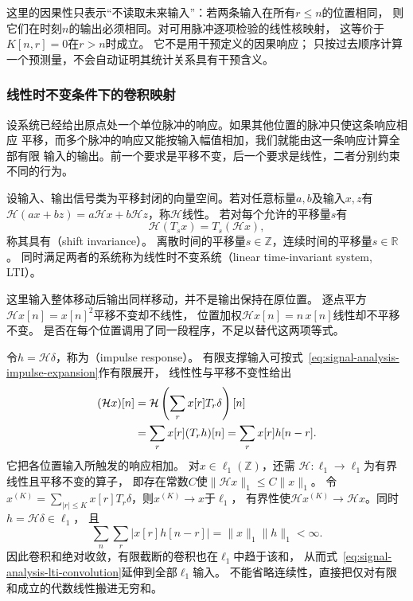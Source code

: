 这里的因果性只表示“不读取未来输入”：若两条输入在所有$r\leq n$的位置相同，
则它们在时刻$n$的输出必须相同。对可用脉冲逐项检验的线性核映射，
这等价于$K[n,r]=0$在$r>n$时成立。
它不是用干预定义的因果响应；
只按过去顺序计算一个预测量，不会自动证明其统计关系具有干预含义。

\subsubsection{线性时不变条件下的卷积映射}
\label{sec:signal-analysis-lti-convolution}

设系统已经给出原点处一个单位脉冲的响应。如果其他位置的脉冲只使这条响应相应
平移，而多个脉冲的响应又能按输入幅值相加，我们就能由这一条响应计算全部有限
输入的输出。前一个要求是平移不变，后一个要求是线性，二者分别约束不同的行为。
\begin{definition}[线性时不变系统]
  \label{def:signal-analysis-lti-system}
  设输入、输出信号类为平移封闭的向量空间。若对任意标量$a,b$及输入$x,z$有
  $\mathcal H(ax+bz)=a\mathcal Hx+b\mathcal Hz$，称$\mathcal H$线性。
  若对每个允许的平移量$s$有
  \[
    \mathcal H(T_sx)=T_s(\mathcal Hx),
  \]
  称其具有（shift invariance）。
  离散时间的平移量$s\in\mathbb Z$，连续时间的平移量$s\in\mathbb R$。
  同时满足两者的系统称为线性时不变系统（linear time-invariant system, LTI）。
\end{definition}
这里输入整体移动后输出同样移动，并不是输出保持在原位置。
逐点平方$\mathcal Hx[n]=x[n]^2$平移不变却不线性，
位置加权$\mathcal Hx[n]=n\,x[n]$线性却不平移不变。
是否在每个位置调用了同一段程序，不足以替代这两项等式。

令$h=\mathcal H\delta$，称为（impulse response）。
有限支撑输入可按式~\eqref{eq:signal-analysis-impulse-expansion}作有限展开，
线性性与平移不变性给出
\begin{align}
  (\mathcal Hx)[n]
  &=\mathcal H\left(\sum_r x[r]T_r\delta\right)[n]\notag\\
  &=\sum_r x[r](T_rh)[n]=\sum_r x[r]h[n-r].
  \label{eq:signal-analysis-lti-convolution}
\end{align}
它把各位置输入所触发的响应相加。
对$x\in\ell_1(\mathbb Z)$，还需
$\mathcal H:\ell_1\to\ell_1$为有界线性且平移不变的算子，
即存在常数$C$使$\|\mathcal Hx\|_1\leq C\|x\|_1$。
令$x^{(K)}=\sum_{|r|\leq K}x[r]T_r\delta$，则$x^{(K)}\to x$于$\ell_1$，
有界性使$\mathcal Hx^{(K)}\to\mathcal Hx$。同时$h=\mathcal H\delta\in\ell_1$，
且
\[
  \sum_n\sum_r|x[r]h[n-r]|=\|x\|_1\|h\|_1<\infty.
\]
因此卷积和绝对收敛，有限截断的卷积也在$\ell_1$中趋于该和，
从而式~\eqref{eq:signal-analysis-lti-convolution}延伸到全部$\ell_1$输入。
不能省略连续性，直接把仅对有限和成立的代数线性搬进无穷和。

